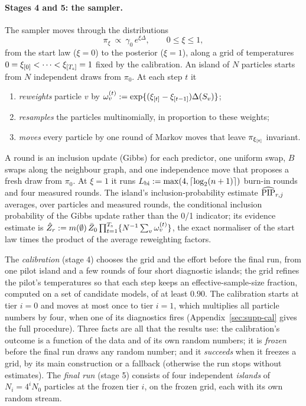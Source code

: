 \paragraph{Stages 4 and 5: the sampler.} The sampler moves through the distributions
\begin{equation}\label{eq:path}
  \pi_\xi\ \propto\ \gamma_0\,e^{\xi\Delta},\qquad 0\le\xi\le1,
\end{equation}
from the start law ($\xi=0$) to the posterior ($\xi=1$), along a grid of temperatures $0=\xi_{[0]}<\dots<\xi_{[T_{\mathrm s}]}=1$ fixed
by the calibration. An island of $N$ particles starts from $N$ independent draws from $\pi_0$. At each step $t$ it
\begin{enumerate}[label=(\alph*),leftmargin=2em,itemsep=0pt,topsep=2pt]
  \item \emph{reweights} particle $v$ by $\omega^{(t)}_v:=\exp\{(\xi_{[t]}-\xi_{[t-1]})\Delta(S_v)\}$;
  \item \emph{resamples} the particles multinomially, in proportion to these weights;
  \item \emph{moves} every particle by one round of Markov moves that leave $\pi_{\xi_{[t]}}$ invariant.
\end{enumerate}
A round is an inclusion update (Gibbs) for each predictor, one uniform swap, $B$ swaps along the neighbour graph, and one
independence move that proposes a fresh draw from $\pi_0$. At $\xi=1$ it runs $L_{\mathrm{bi}}:=\max(4,\lceil\log_2(n+1)\rceil)$ burn-in rounds
and four measured rounds. The island's inclusion-probability estimate $\widehat{\mathrm{PIP}}_{r,j}$ averages, over particles and measured
rounds, the conditional inclusion probability of the Gibbs update rather than the 0/1 indicator; its evidence estimate is
$\hat Z_r:=m(\emptyset)\,\bar Z_0\prod_{t=1}^{T_{\mathrm s}}\{N^{-1}\sum_v\omega^{(t)}_v\}$, the exact normaliser of the start law times
the product of the average reweighting factors.

The \emph{calibration} (stage 4) chooses the grid and the effort before the final run, from one pilot island and a few
rounds of four short diagnostic islands; the grid refines the pilot's temperatures so that each step keeps an
effective-sample-size fraction, computed on a set of candidate models, of at least $0.90$. The calibration starts at
tier $i=0$ and moves at most once to tier $i=1$, which multiplies all particle numbers by four, when one of its
diagnostics fires (Appendix~\ref{sec:supp-cal} gives the full procedure). Three facts are all that the results use: the calibration's outcome is a function of the data and of its own
random numbers; it is \emph{frozen} before the final run draws any random number; and it \emph{succeeds} when it freezes a
grid, by its main construction or a fallback (otherwise the run stops without estimates). The \emph{final run} (stage 5)
consists of four independent \emph{islands} of $N_i=4^iN_0$ particles at the frozen tier $i$, on the frozen grid, each with
its own random stream.

